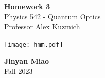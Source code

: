 \documentclass[11pt, oneside]{book}
\theoremstyle{break}
\theoremstyle{break}
\begin{document}
	\begin{titlepage}
		\begin{center}
			\vspace*{0.5cm}
			\Huge \color{red}
				\textbf{Homework 3}\\
			\vspace{0.5cm}			
			\Large \color{black}
			Physics 542 - Quantum Optics\\
			Professor Alex Kuzmich
			\vspace{1.5cm}

			\texttt{[image: hmm.pdf]}
			
			
			\vspace{2cm}
			\LARGE
				\textbf{Jinyan Miao}\\
				\hfill\break
				\LARGE Fall 2023\\
			\vspace{1cm}

		\vspace*{\fill}
		\end{center}			
	\end{titlepage}
\end{document}
